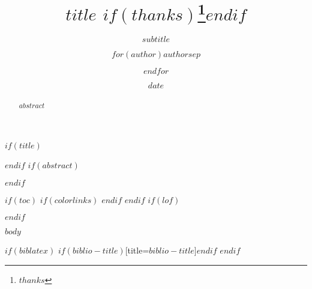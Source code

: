 \documentclass[$if(fontsize)$$fontsize$,$endif$hidelinks]{$documentclass$}
\title{$title$ $if(thanks)$\thanks{$thanks$}$endif$}
\subtitle{$subtitle$}
\author{$for(author)$$author$$sep$ \and $endfor$}
\institute{$for(institute)$$institute$$sep$ \and $endfor$}
\date{$date$}
\begin{document}
$if(title)$
\maketitle
$endif$
$if(abstract)$

\newpage{}

\begin{abstract}
$abstract$
\end{abstract}
$endif$

\newpage{}

$if(toc)$
{
$if(colorlinks)$
\hypersetup{linkcolor=$if(toccolor)$$toccolor$$else$black$endif$}
$endif$
\setcounter{tocdepth}{$toc-depth$}
\tableofcontents
\newpage{}
}
$endif$
$if(lof)$
\listoffigures
\newpage{}
$endif$

$body$

$if(biblatex)$
\printbibliography$if(biblio-title)$[title=$biblio-title$]$endif$
$endif$
\end{document}
